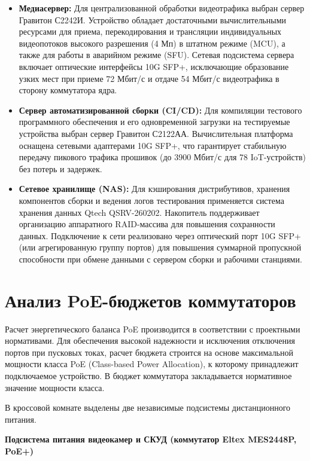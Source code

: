 \documentclass{bmstu}
\begin{document}
\begin{itemize}
    \item \textbf{Медиасервер:} Для централизованной обработки видеотрафика выбран сервер Гравитон С2242И. Устройство обладает достаточными вычислительными ресурсами для приема, перекодирования и трансляции индивидуальных видеопотоков высокого разрешения (4 Мп) в штатном режиме (MCU), а также для работы в аварийном режиме (SFU). Сетевая подсистема сервера включает оптические интерфейсы 10G SFP+, исключающие образование узких мест при приеме 72 Мбит/с и отдаче 54 Мбит/с видеотрафика в сторону коммутатора ядра. 
    \item \textbf{Сервер автоматизированной сборки (CI/CD):} Для компиляции тестового программного обеспечения и его одновременной загрузки на тестируемые устройства выбран сервер Гравитон С2122АА. Вычислительная платформа оснащена сетевыми адаптерами 10G SFP+, что гарантирует стабильную передачу пикового трафика прошивок (до 3900 Мбит/с для 78 IoT-устройств) без потерь и задержек. 
    \item \textbf{Сетевое хранилище (NAS):} Для кэширования дистрибутивов, хранения компонентов сборки и ведения логов тестирования применяется система хранения данных Qtech QSRV-260202. Накопитель поддерживает организацию аппаратного RAID-массива для повышения сохранности данных. Подключение к сети реализовано через оптический порт 10G SFP+ (или агрегированную группу портов) для повышения суммарной пропускной способности при обмене данными с сервером сборки и рабочими станциями.
\end{itemize}




\section{Анализ PoE-бюджетов коммутаторов}

Расчет энергетического баланса PoE производится в соответствии с проектными нормативами. Для обеспечения высокой надежности и исключения отключения портов при пусковых токах, расчет бюджета строится на основе максимальной мощности класса PoE (Class-based Power Allocation), к которому принадлежит подключаемое устройство. В бюджет коммутатора закладывается нормативное значение мощности класса.

В кроссовой комнате выделены две независимые подсистемы дистанционного питания.

\textbf{Подсистема питания видеокамер и СКУД (коммутатор Eltex MES2448P, PoE+)}
\end{document}
